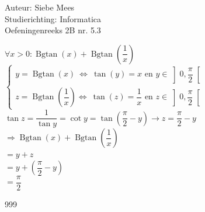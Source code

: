 \documentclass[a4paper]{article}
\newcommand{\Bgtan}{\operatorname{Bgtan}}
\begin{document}
  
\noindent \large Auteur: Siebe Mees \\
\noindent \large Studierichting: Informatica\\
\noindent \large Oefeningenreeks 2B nr. 5.3\\

\medskip

\normalsize

$ \forall x > 0: \Bgtan(x)+\Bgtan\!\left( \dfrac{1}{x} \right) $\\

$ \left \{
\begin{array}{l}
y=\Bgtan(x)\ \Longleftrightarrow\ \tan(y)=x \text{ en } y \in \left]0, \dfrac{\pi}{2} \right[ \\
z=\Bgtan\!\left( \dfrac{1}{x} \right) \Longleftrightarrow\ \tan(z)= \dfrac{1}{x} \text{ en } z \in \left]0, \dfrac{\pi}{2} \right[ 
\end{array}
\right . $\\

$ \tan z = \dfrac{1}{\tan y} = \cot y = \tan\left(\dfrac{\pi}{2}-y \right) \rightarrow z = \dfrac{\pi}{2} - y $\\

$ \Rightarrow \Bgtan(x)+\Bgtan\!\left( \dfrac{1}{x} \right) $\\

$ = y + z $\\

$ = y + \left(\dfrac{\pi}{2} - y \right)$\\

$ = \dfrac{\pi}{2} $\\

\begin{thebibliography}{999}

\end{thebibliography}
\end{document}

